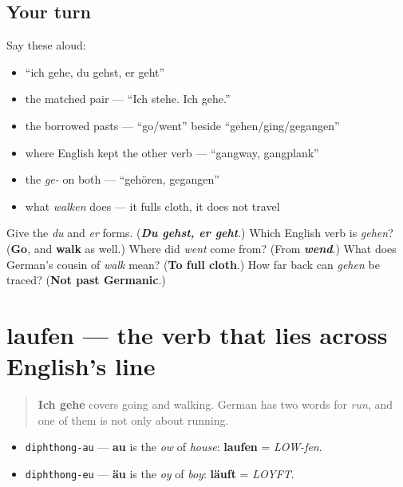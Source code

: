 \subsection*{Your turn}
Say these aloud:

\begin{itemize}
\raggedright
  \item \textquotedblleft{}ich gehe, du gehst, er geht\textquotedblright{}
  \item the matched pair — \textquotedblleft{}Ich stehe. Ich gehe.\textquotedblright{}
  \item the borrowed pasts — \textquotedblleft{}go/went\textquotedblright{} beside \textquotedblleft{}gehen/ging/gegangen\textquotedblright{}
  \item where English kept the other verb — \textquotedblleft{}gangway, gangplank\textquotedblright{}
  \item the \emph{ge-} on both — \textquotedblleft{}gehören, gegangen\textquotedblright{}
  \item what \emph{walken} does — it fulls cloth, it does not travel
\end{itemize}

\begin{tcolorbox}[breakable,colback=teal!4,colframe=teal!35!black,title={Before you move on}]
Give the \emph{du} and \emph{er} forms. (\emph{\textbf{Du gehst, er geht}}.) Which English verb is \emph{gehen}? (\textbf{Go}, and \textbf{walk} as well.) Where did \emph{went} come from? (From \emph{\textbf{wend}}.) What does German's cousin of \emph{walk} mean? (\textbf{To full cloth}.) How far back can \emph{gehen} be traced? (\textbf{Not past Germanic}.)
\end{tcolorbox}
\section[laufen]{laufen — the verb that lies across English's line}

\label{lesson:GE-C27-laufen}



\begin{quote}
\textbf{Ich gehe} covers going and walking. German has two words for \emph{run}, and one of them is not only about running.
\end{quote}

\begin{sounds}
\begin{itemize}
\raggedright
  \item \texttt{diphthong-au} — \textbf{au} is the \emph{ow} of \emph{house}: \textbf{laufen} = \emph{LOW-fen}.
  \item \texttt{diphthong-eu} — \textbf{äu} is the \emph{oy} of \emph{boy}: \textbf{läuft} = \emph{LOYFT}.
\end{itemize}
\end{sounds}

